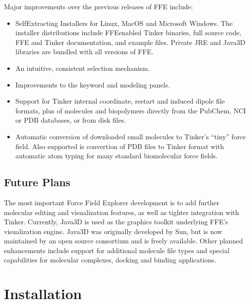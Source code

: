 \documentclass[letterpaper,11pt,english]{sphinxmanual}
\begin{document}
Major improvements over the previous releases of FFE include:
\begin{itemize}
\item {} 
Self\sphinxhyphen{}Extracting Installers for Linux, MacOS and Microsoft Windows. The installer distributions include FFE\sphinxhyphen{}enabled Tinker binaries, full source code, FFE and Tinker documentation, and example files. Private JRE and Java3D libraries are bundled with all versions of FFE.

\item {} 
An intuitive, consistent selection mechanism.

\item {} 
Improvements to the keyword and modeling panels.

\item {} 
Support for Tinker internal coordinate, restart and induced dipole file formats, plus of molecules and biopolymers directly from the PubChem, NCI or PDB databases,  or from disk files.

\item {} 
Automatic conversion of downloaded small molecules to Tinker’s “tiny” force field. Also supported is convertion of PDB files to Tinker format with automatic atom typing for many standard biomolecular force fields.

\end{itemize}


\section{Future Plans}
\label{\detokenize{text/introduction:future-plans}}
The most important Force Field Explorer development is to add further molecular editing and visualization features, as well as tighter integration with Tinker. Currently, Java3D is used as the graphics toolkit underlying FFE’s visualization engine. Java3D was originally developed by Sun, but is now maintained by an open source consortium and is freely available. Other planned enhancements include support for additional molecule file types and special capabilities for molecular complexes, docking and binding applications.


\chapter{Installation}
\label{\detokenize{text/installation:installation}}\label{\detokenize{text/installation::doc}}
\end{document}
